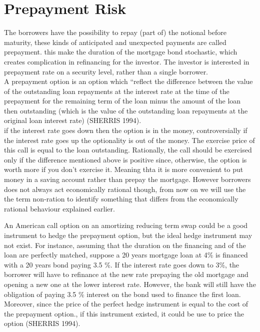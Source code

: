 \documentclass[12pt,twoside]{reedthesis}
\begin{document}
\hypertarget{prepayment-risk}{%
\section{Prepayment Risk}\label{prepayment-risk}}

The borrowers have the possibility to repay (part of) the notional before maturity, these kinds of anticipated and unexpected payments are called prepayment. this make the duration of the mortgage bond stochastic, which creates complication in refinancing for the investor. The investor is interested in prepayment rate on a security level, rather than a single borrower.\\
A prepayment option is an option which ``reflect the difference between the value of the outstanding loan repayments at the interest rate at the time of the prepayment for the remaining term of the loan minus the amount of the loan then outstanding (which is the value of the outstanding loan repayments at the original loan interest rate) (SHERRIS 1994).\\
if the interest rate goes down then the option is in the money, controversially if the interest rate goes up the optionality is out of the money. The exercise price of this call is equal to the loan outstanding. Rationally, the call should be exercised only if the difference mentioned above is positive since, otherwise, the option is worth more if you don't exercise it. Meaning thta it is more convenient to put money in a saving account rather than prepay the mortgage. However borrowers does not always act economically rational though, from now on we will use the the term non-ration to identify something that differs from the economically rational behaviour explained earlier.

An American call option on an amortizing reducing term swap could be a good instrument to hedge the prepayment option, but the ideal hedge instrument may not exist. For instance, assuming that the duration on the financing and of the loan are perfectly matched, suppose a 20 years mortgage loan at 4\% is financed with a 20 years bond paying 3.5 \%. If the interest rate goes down to 3\%, the borrower will have to refinance at the new rate prepaying the old mortgage and opening a new one at the lower interest rate. However, the bank will still have the obligation of paying 3.5 \% interest on the bond used to finance the first loan. Moreover, since the price of the perfect hedge instrument is equal to the cost of the prepayment option., if this instrument existed, it could be use to price the option (SHERRIS 1994).
\end{document}
